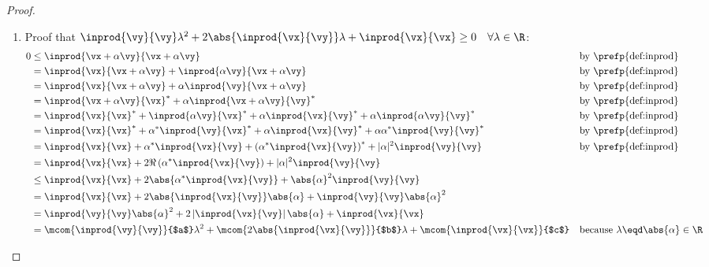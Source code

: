 \begin{proof}
\begin{enumerate}
\begin{enumerate}
    \item Proof that
      $\inprod{\vy}{\vy } \lambda^2 +2\abs{\inprod{\vx }{\vy}} \lambda + \inprod{\vx}{\vx}\ge0
       \quad\forall\lambda\in\R$:
      \begin{align*}
         0
           &\le \inprod{ \vx + \alpha \vy }{ \vx + \alpha \vy }
           &&   \text{by \prefp{def:inprod}}
         \\&=   \inprod{\vx}{\vx + \alpha \vy }
            +   \inprod{\alpha \vy }{ \vx + \alpha \vy }
           &&   \text{by \prefp{def:inprod}}
         \\&=   \inprod{\vx}{\vx + \alpha \vy }
            +   \alpha \inprod{\vy }{ \vx + \alpha \vy }
           &&   \text{by \prefp{def:inprod}}
         \\&=   \inprod{\vx + \alpha \vy }{\vx}^\ast
            +   \alpha \inprod{ \vx + \alpha \vy }{\vy }^\ast
           &&   \text{by \prefp{def:inprod}}
         \\&=   \inprod{\vx}{\vx}^\ast
            +   \inprod{\alpha \vy }{\vx}^\ast
            +   \alpha \inprod{\vx}{\vy }^\ast
            +   \alpha \inprod{\alpha \vy }{\vy }^\ast
           &&   \text{by \prefp{def:inprod}}
         \\&=   \inprod{\vx}{\vx}^\ast
            +   \alpha^\ast \inprod{\vy }{\vx}^\ast
            +   \alpha \inprod{\vx}{\vy }^\ast
            +   \alpha\alpha^\ast \inprod{\vy}{\vy }^\ast
           &&   \text{by \prefp{def:inprod}}
         \\&=   \inprod{\vx}{\vx}
            +   \alpha^\ast \inprod{\vx }{\vy}
            +   \left(\alpha^\ast \inprod{\vx}{\vy }\right)^\ast
            +   |\alpha|^2 \inprod{\vy}{\vy }
           &&   \text{by \prefp{def:inprod}}
         \\&=   \inprod{\vx}{\vx}
            +   2\Re\left(\alpha^\ast \inprod{\vx }{\vy}\right)
            +   |\alpha|^2 \inprod{\vy}{\vy }
         \\&\le \inprod{\vx}{\vx}
            +   2\abs{\alpha^\ast \inprod{\vx }{\vy}}
            +   \abs{\alpha}^2 \inprod{\vy}{\vy }
         \\&=   \inprod{\vx}{\vx}
            +   2\abs{\inprod{\vx }{\vy}} \abs{\alpha}
            +   \inprod{\vy}{\vy } \abs{\alpha}^2
         \\&=   \inprod{\vy}{\vy } \abs{\alpha}^2
            +   2\left|\inprod{\vx }{\vy}\right| \abs{\alpha}
            +    \inprod{\vx}{\vx}
         \\&=   \mcom{\inprod{\vy}{\vy }}{$a$} \lambda^2
            +   \mcom{2\abs{\inprod{\vx }{\vy}}}{$b$} \lambda
            +   \mcom{\inprod{\vx}{\vx}}{$c$}
           &&   \text{because $\lambda\eqd\abs{\alpha}\in\R$}
      \end{align*}


\end{enumerate}
\end{enumerate}
\end{proof}
